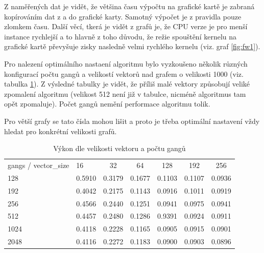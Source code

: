 \documentclass[11pt, fleqn]{article}
\begin{document}
Z naměřených dat je vidět, že většina času výpočtu na grafické kartě je zabraná kopírováním dat z a do grafické karty. Samotný výpočet je z pravidla pouze zlomkem času. Další věcí, tkerá je vidět z grafů je, že CPU verze je pro menší instance rychlejší a to hlavně z toho důvodu, že režie spouštění kernelu na grafické kartě převyšuje zisky nasledně velmi rychlého kernelu (viz. graf \ref{fig:fw1}).

Pro nalezení optimálního nastaení algoritmu bylo vyzkoušeno několik různých konfigurací počtu gangů a velikostí vektorů nad grafem o velikosti 1000 (viz. tabulka \ref{fig:fw2}). Z výsledné tabulky je vidět, že příliš malé vektory způsobují veliké zpomalení algoritmu (velikost 512 není již v tabulce, nicméně algoritmus tam opět zpomaluje). Počet gangů nemění performace algoritmu tolik.

Pro větší grafy se tato čísla mohou lišit a proto je třeba optimální nastavení vždy hledat pro konkrétní velikosti grafů.

\begin{table}[tbp]
  \centering
  \caption{Výkon dle velikosti vektoru a počtu gangů}
  \label{fig:fw2}
  \def\arraystretch{2}
  \begin{tabular}{llccccc}
    gangs / vector\_size & 16 & 32 & 64 & 128 & 192 & 256 \\
    \rowcolor[HTML]{ECF4FF} 
    128  & 0.5910 & 0.3179 & 0.1677 & 0.1103 & 0.1107 & 0.0936 \\
    192  & 0.4042 & 0.2175 & 0.1143 & 0.0916 & 0.1011 & 0.0919 \\
    \rowcolor[HTML]{ECF4FF} 
    256  & 0.4566 & 0.2440 & 0.1251 & 0.0941 & 0.0975 & 0.0941 \\
    512  & 0.4457 & 0.2480 & 0.1286 & 0.9391 & 0.0924 & 0.0911 \\
    \rowcolor[HTML]{ECF4FF} 
    1024 & 0.4118 & 0.2228 & 0.1165 & 0.0905 & 0.0915 & 0.0901 \\
    2048 & 0.4116 & 0.2272 & 0.1183 & 0.0900 & 0.0903 & 0.0896
  \end{tabular}
\end{table}
\end{document}
